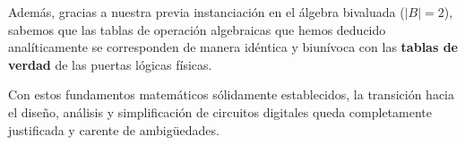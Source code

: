 Además, gracias a nuestra previa instanciación en el álgebra bivaluada ($|B|=2$), sabemos que las tablas de operación algebraicas que hemos deducido analíticamente se corresponden de manera idéntica y biunívoca con las \textbf{tablas de verdad} de las puertas lógicas físicas.

Con estos fundamentos matemáticos sólidamente establecidos, la transición hacia el diseño, análisis y simplificación de circuitos digitales queda completamente justificada y carente de ambigüedades.

